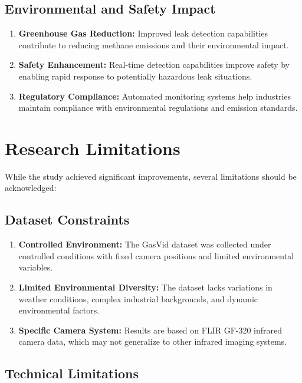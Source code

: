 \subsection{Environmental and Safety Impact}

\begin{enumerate}
\item \textbf{Greenhouse Gas Reduction:} Improved leak detection capabilities contribute to reducing methane emissions and their environmental impact.

\item \textbf{Safety Enhancement:} Real-time detection capabilities improve safety by enabling rapid response to potentially hazardous leak situations.

\item \textbf{Regulatory Compliance:} Automated monitoring systems help industries maintain compliance with environmental regulations and emission standards.
\end{enumerate}

\section{Research Limitations}

While the study achieved significant improvements, several limitations should be acknowledged:

\subsection{Dataset Constraints}

\begin{enumerate}
\item \textbf{Controlled Environment:} The GasVid dataset was collected under controlled conditions with fixed camera positions and limited environmental variables.

\item \textbf{Limited Environmental Diversity:} The dataset lacks variations in weather conditions, complex industrial backgrounds, and dynamic environmental factors.

\item \textbf{Specific Camera System:} Results are based on FLIR GF-320 infrared camera data, which may not generalize to other infrared imaging systems.
\end{enumerate}

\subsection{Technical Limitations}

